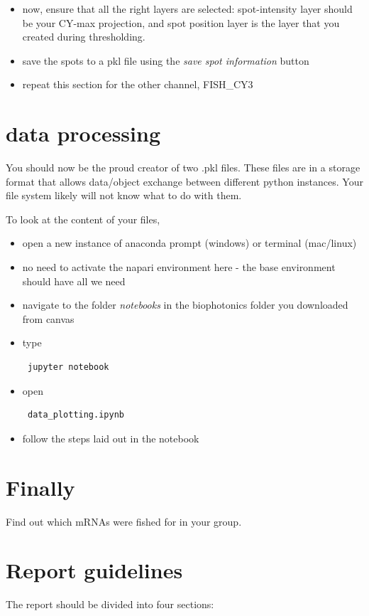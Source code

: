 \documentclass[11pt]{article} %
\begin{document}
\begin{itemize}
\item now, ensure that all the right layers are selected: spot-intensity layer should be your CY-max projection, and spot position layer is the layer that you created during thresholding. 
\item save the spots to a pkl file using the {\it save spot information} button
\item repeat this section for the other channel, FISH\_CY3
\end{itemize}

\section{data processing}
You should now be the proud creator of two .pkl files. These files are in a storage format that allows data/object exchange between different python instances. Your file system likely will not know what to do with them. 

To look at the content of your files, 
\begin{itemize}
\item open a new instance of anaconda prompt (windows) or terminal (mac/linux)
\item no need to activate the napari environment here - the base environment should have all we need 
\item navigate to the folder {\it notebooks} in the biophotonics folder you downloaded from canvas
\item type \begin{verbatim} jupyter notebook \end{verbatim}
\item open \begin{verbatim} data_plotting.ipynb \end{verbatim}
\item follow the steps laid out in the notebook
\end{itemize}

\section{Finally}
Find out which mRNAs were fished for in your group.

\section{Report guidelines}
The report should be divided into four sections:
\end{document}
